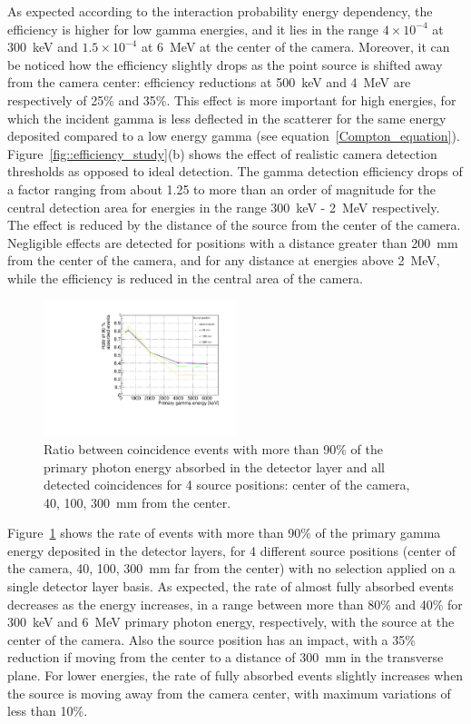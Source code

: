 As expected according to the interaction probability energy dependency, the efficiency is higher for low gamma energies, and it lies in the range $4\times10^{-4}$ at 300~keV and $1.5\times10^{-4}$ at 6~MeV at the center of the camera. Moreover, it can be noticed how the efficiency slightly drops as the point source is shifted away from the camera center: efficiency reductions at 500~keV and 4~MeV are respectively of 25\% and 35\%. This effect is more important for high energies, for which the incident gamma is less deflected in the scatterer for the same energy deposited compared to a low energy gamma (see equation~\ref{Compton_equation}).\\  
Figure~\ref{fig::efficiency_study}(b) shows the effect of realistic camera detection thresholds as opposed to ideal detection. The gamma detection efficiency drops of a factor ranging from about 1.25 to more than an order of magnitude for the central detection area for energies in the range 300~keV - 2~MeV respectively. The effect is reduced by the distance of the source from the center of the camera. Negligible effects are detected for positions with a distance greater than 200~mm from the center of the camera, and for any distance at energies above 2~MeV, while the efficiency is reduced in the central area of the camera.\\

\begin{figure} [!hbtp]	
\centering
\includegraphics[width=0.5\textwidth]{./Figure/new/rate_90percent_energy_4distances.pdf}
\caption{Ratio between coincidence events with more than 90\% of the primary photon energy absorbed in the detector layer and all detected coincidences for 4 source positions: center of the camera, 40, 100, 300~mm from the center.}
\label{fig::rate_full_abs}
\end{figure}


Figure~\ref{fig::rate_full_abs} shows the rate of events with more than 90\% of the primary gamma energy deposited in the detector layers, for 4 different source positions (center of the camera, 40, 100, 300~mm far from the center) with no selection applied on a single detector layer basis. As expected, the rate of almost fully absorbed events decreases as the energy increases, in a range between more than 80\% and 40\% for 300~keV and 6~MeV primary photon energy, respectively, with the source at the center of the camera. Also the source position has an impact, with a 35\% reduction if moving from the center to a distance of 300~mm in the transverse plane. For lower energies, the rate of fully absorbed events slightly increases when the source is moving away from the camera center, with maximum variations of less than 10\%. 
 

